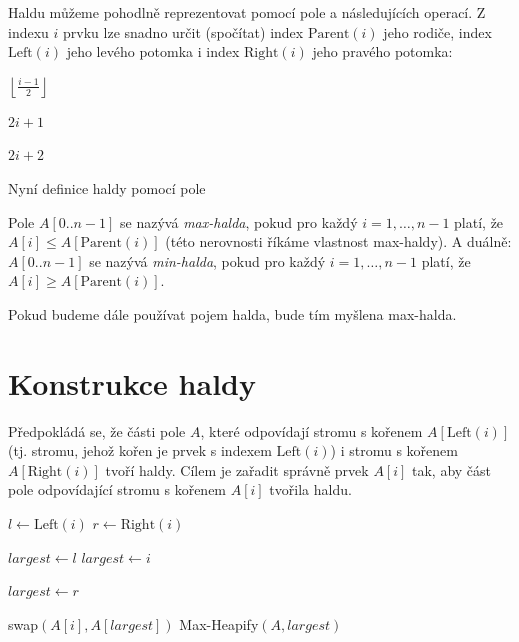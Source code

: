 \documentclass[openany,12pt,a4paper]{book}
\begin{document}
Haldu můžeme pohodlně reprezentovat pomocí pole a následujících operací.
Z indexu $i$ prvku lze snadno určit (spočítat) index $\text{Parent}(i)$ jeho rodiče,
index $\text{Left}(i)$ jeho levého potomka i index $\text{Right}(i)$ jeho pravého potomka:

\begin{algorithm}[H]
\caption{Parent$(i)$}
\begin{algorithmic}[1]
\State \Return $\left\lfloor \frac{i - 1}{2} \right\rfloor$
\end{algorithmic}
\end{algorithm}

\begin{algorithm}[H]
\caption{Left$(i)$}
\begin{algorithmic}[1]
\State \Return $2i + 1$
\end{algorithmic}
\end{algorithm}

\begin{algorithm}[H]
\caption{Right$(i)$}
\begin{algorithmic}[1]
\State \Return $2i + 2$
\end{algorithmic}
\end{algorithm}

Nyní definice haldy pomocí pole 

\begin{definition}
Pole $A[0..n-1]$ se nazývá \emph{max-halda}, pokud pro každý  
$i = 1, \ldots, n-1$ platí, že $A[i] \le A[\text{Parent}(i)]$ (této nerovnosti říkáme
vlastnost max-haldy).
A duálně:
$A[0..n-1]$ se nazývá \emph{min-halda}, pokud pro každý  
$i = 1, \ldots, n-1$ platí, že $A[i] \ge A[\text{Parent}(i)]$.
\end{definition}

Pokud budeme dále používat pojem halda, bude tím myšlena max-halda.


\section{Konstrukce haldy}
Předpokládá se, že části pole $A$, které odpovídají stromu s kořenem
$A[\text{Left}(i)]$ (tj. stromu, jehož kořen je prvek s indexem $\text{Left}(i)$)
i stromu s kořenem $A[\text{Right}(i)]$ tvoří haldy.
Cílem je zařadit správně prvek $A[i]$ tak, aby část pole odpovídající stromu
s kořenem $A[i]$ tvořila haldu.

\begin{algorithm}[H]
\caption{Max-Heapify$(A, i)$}
\begin{algorithmic}[1]

\State $l \gets \text{Left}(i)$
\State $r \gets \text{Right}(i)$

    \State $largest \gets l$
\Else
    \State $largest \gets i$
\EndIf

    \State $largest \gets r$
\EndIf

    \State swap$(A[i], A[largest])$
    \State Max-Heapify$(A, largest)$
\EndIf
\end{algorithmic}
\end{algorithm}
\end{document}
